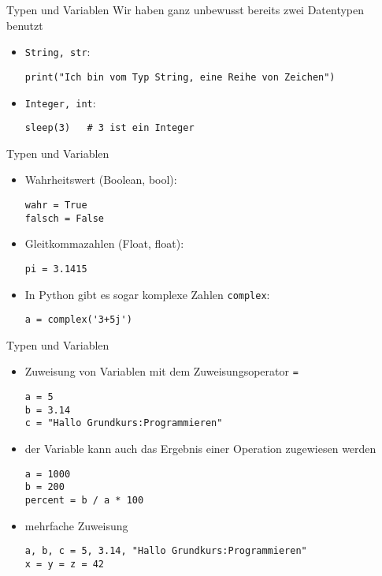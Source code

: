\begin{frame}[fragile]{Typen und Variablen}
Wir haben ganz unbewusst bereits zwei Datentypen benutzt
\begin{itemize}
    \item \texttt{String, str}: 
    \begin{lstlisting}
print("Ich bin vom Typ String, eine Reihe von Zeichen")
    \end{lstlisting}
    \item \texttt{Integer, int}: 
    \begin{lstlisting}
sleep(3)   # 3 ist ein Integer
    \end{lstlisting}
\end{itemize}
\end{frame}

\begin{frame}[fragile]{Typen und Variablen}
\begin{itemize}
    \item Wahrheitswert (Boolean, bool): 
    \begin{lstlisting}
wahr = True
falsch = False
    \end{lstlisting}
    \item Gleitkommazahlen (Float, float):
    \begin{lstlisting}
pi = 3.1415
    \end{lstlisting}
    \item In Python gibt es sogar komplexe Zahlen \texttt{complex}:
    \begin{lstlisting}
a = complex('3+5j')
    \end{lstlisting}

\end{itemize}
\end{frame}

\begin{frame}[fragile]{Typen und Variablen}
\begin{itemize}
    \item Zuweisung von Variablen mit dem Zuweisungsoperator \texttt{=}
    \begin{lstlisting}
a = 5
b = 3.14
c = "Hallo Grundkurs:Programmieren"
    \end{lstlisting}
    \item der Variable kann auch das Ergebnis einer Operation zugewiesen werden
    \begin{lstlisting}
a = 1000
b = 200
percent = b / a * 100
    \end{lstlisting}
    \item mehrfache Zuweisung 
    \begin{lstlisting}
a, b, c = 5, 3.14, "Hallo Grundkurs:Programmieren"
x = y = z = 42
    \end{lstlisting}
\end{itemize}
\end{frame}


